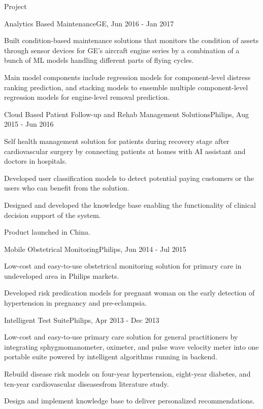 \documentclass{resume} %
\begin{document}
\begin{rSection}{Project}
\begin{rSubsection}{Analytics Based Maintenance}{}{GE, Jun 2016 - Jan 2017}{}
\item Built condition-based maintenance solutions that monitors the condition of assets through sensor devices for GE's aircraft engine series by a combination of a bunch of ML models handling different parts of flying cycles.
\item Main model components include regression models for component-level distress ranking prediction, and stacking models to ensemble multiple component-level regression models for engine-level removal prediction.
\end{rSubsection}


\begin{rSubsection}{Cloud Based Patient Follow-up and Rehab Management Solutions}{}{Philips, Aug 2015 - Jun 2016}{}
\item Self health management solution for patients during recovery stage after cardiovascular surgery by connecting patients at homes with AI assistant and doctors in hospitals.
\item Developed user classification models to detect potential paying customers or the users who can benefit from the solution.
\item Designed and developed the knowledge base enabling the functionality of clinical decision support of the system.
\item Product launched in China.
\end{rSubsection}


\begin{rSubsection}{Mobile Obstetrical Monitoring}{}{Philips, Jun 2014 - Jul 2015}{}
\item Low-cost and easy-to-use obstetrical monitoring solution for primary care in undeveloped area in Philips markets.
\item Developed risk predication models for pregnant woman on the early detection of hypertension in pregnancy and pre-eclampsia.
\end{rSubsection}


\begin{rSubsection}{Intelligent Test Suite}{}{Philips, Apr 2013 - Dec 2013}{}
\item Low-cost and easy-to-use primary care solution for general practitioners by integrating sphygmomanometer, oximeter, and pulse wave velocity meter into one portable suite powered by intelligent algorithms running in backend.
\item Rebuild disease risk models on four-year hypertension, eight-year diabetes, and ten-year cardiovascular diseasesfrom literature study.
\item Design and implement knowledge base to deliver personalized recommendations.
\end{rSubsection}


\end{rSection}
\end{document}
